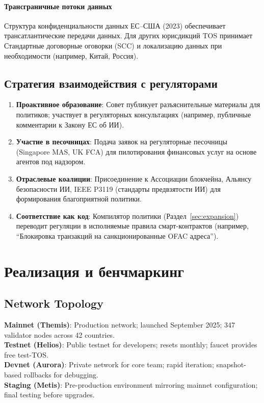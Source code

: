 \documentclass[11pt]{article}
\begin{document}
\paragraph{Трансграничные потоки данных}
Структура конфиденциальности данных ЕС--США (2023) обеспечивает трансатлантические передачи данных. Для других юрисдикций TOS принимает Стандартные договорные оговорки (SCC) и локализацию данных при необходимости (например, Китай, Россия).

\subsection{Стратегия взаимодействия с регуляторами}

\begin{enumerate}[noitemsep]
  \item \textbf{Проактивное образование}: Совет публикует разъяснительные материалы для политиков; участвует в регуляторных консультациях (например, публичные комментарии к Закону ЕС об ИИ).
  \item \textbf{Участие в песочницах}: Подача заявок на регуляторные песочницы (Singapore MAS, UK FCA) для пилотирования финансовых услуг на основе агентов под надзором.
  \item \textbf{Отраслевые коалиции}: Присоединение к Ассоциации блокчейна, Альянсу безопасности ИИ, IEEE P3119 (стандарты предвзятости ИИ) для формирования благоприятной политики.
  \item \textbf{Соответствие как код}: Компилятор политики (Раздел~\ref{sec:expansion}) переводит регуляции в исполняемые правила смарт-контрактов (например, ``Блокировка транзакций на санкционированные OFAC адреса'').
\end{enumerate}

\section{Реализация и бенчмаркинг}
\label{sec:implementation}

\subsection{Network Topology}

\textbf{Mainnet (Themis)}: Production network; launched September 2025; 347 validator nodes across 42 countries.\\
\textbf{Testnet (Helios)}: Public testnet for developers; resets monthly; faucet provides free test-TOS.\\
\textbf{Devnet (Aurora)}: Private network for core team; rapid iteration; snapshot-based rollbacks for debugging.\\
\textbf{Staging (Metis)}: Pre-production environment mirroring mainnet configuration; final testing before upgrades.
\end{document}
